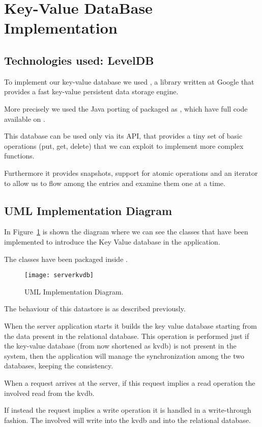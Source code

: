 \section{Key-Value DataBase Implementation }

\subsection{Technologies used: LevelDB}

To implement our key-value database we used , a library
written at Google that provides a fast key-value persistent data storage engine.

More precisely we used the Java porting of  packaged as
, which have full code available on .



This database can be used only via its API, that provides a tiny set of basic
operations (put, get, delete) that we can exploit to implement more complex
functions.

Furthermore it provides snapshots, support for atomic operations and
an iterator to allow us to flow among the entries and examine them one at a
time.

\subsection{UML Implementation Diagram}

In Figure~\ref{fig:serverkvdb} is shown the diagram where we can see the classes
that have been implemented to introduce the Key Value database in the
application.

The classes have been packaged inside .

\begin{landscape}
	\begin{figure}
		\texttt{[image: serverkvdb]}
		\caption{ UML Implementation Diagram.}
		\label{fig:serverkvdb}
	\end{figure}
\end{landscape}

The behaviour of this datastore is as described previously.

When the server application starts it builds the key value database starting
from the data present in the relational database. This operation is performed
just if the key-value database (from now shortened as kvdb) is not present in
the system, then the application will manage the synchronization among the two
databases, keeping the consistency.

When a request arrives at the server, if this request implies a read operation
the  involved read from the kvdb.

If instead the request implies a write operation it is handled in a
write-through fashion. The  involved will write into the
kvdb and into the relational database.
